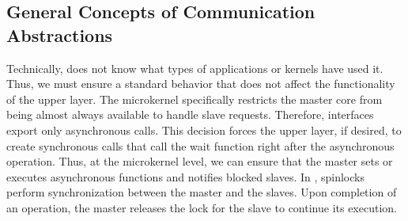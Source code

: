 		\subsection{General Concepts of Communication Abstractions}
		\label{sec.general-concepts}



			Technically, \nanvix \hal does not know what types of applications
			or kernels have used it. Thus, we must ensure a standard behavior
			that does not affect the functionality of the upper layer. The
			microkernel specifically restricts the master core from being
			almost always available to handle slave requests. Therefore,
			interfaces export only asynchronous calls. This decision forces
			the upper layer, if desired, to create synchronous calls that
			call the wait function right after the asynchronous operation.
			Thus, at the microkernel level, we can ensure that the master
			sets or executes asynchronous functions and notifies blocked
			slaves. In \mppa, spinlocks perform synchronization between the
			master and the slaves. Upon completion of an operation, the master
			releases the lock for the slave to continue its execution.

